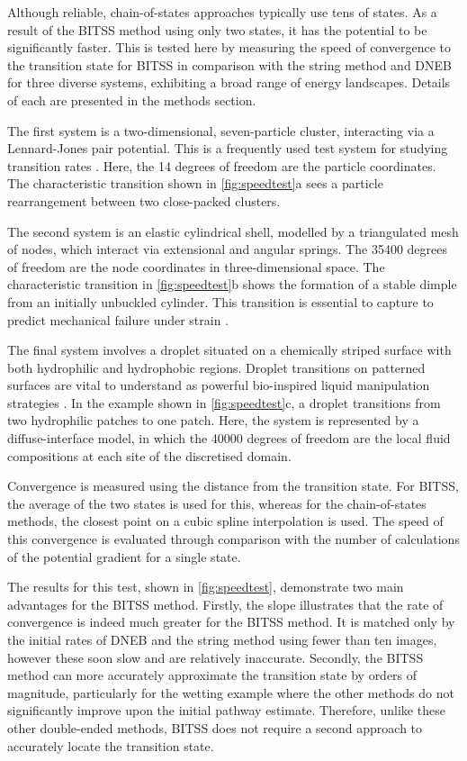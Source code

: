 \documentclass[twocolumn,10pt]{revtex4}
\begin{document}
Although reliable, chain-of-states approaches typically use tens of states.
As a result of the BITSS method using only two states, it has the potential to be significantly faster.
This is tested here by measuring the speed of convergence to the transition state for BITSS in comparison with the string method and DNEB for three diverse systems, exhibiting a broad range of energy landscapes.
Details of each are presented in the methods section.

The first system is a two-dimensional, seven-particle cluster, interacting via a Lennard-Jones pair potential.
This is a frequently used test system for studying transition rates \cite{Wales2002,Passerone2001}.
Here, the \num{14} degrees of freedom are the particle coordinates.
The characteristic transition shown in \cref{fig:speedtest}a sees a particle rearrangement between two close-packed clusters.

The second system is an elastic cylindrical shell, modelled by a triangulated mesh of nodes, which interact via extensional and angular springs.
The \num{35400} degrees of freedom are the node coordinates in three-dimensional space.
The characteristic transition in \cref{fig:speedtest}b shows the formation of a stable dimple from an initially unbuckled cylinder.
This transition is essential to capture to predict mechanical failure under strain \cite{Panter2019,Virot2017}.

The final system involves a droplet situated on a chemically striped surface with both hydrophilic and hydrophobic regions.
Droplet transitions on patterned surfaces are vital to understand as powerful bio-inspired liquid manipulation strategies  \cite{Kusumaatmaja2006,Brown2016}.
In the example shown in \cref{fig:speedtest}c, a droplet transitions from two hydrophilic patches to one patch.
Here, the system is represented by a diffuse-interface model, in which the \num{40000} degrees of freedom are the local fluid compositions at each site of the discretised domain.

Convergence is measured using the distance from the transition state.
For BITSS, the average of the two states is used for this, whereas for the chain-of-states methods, the closest point on a cubic spline interpolation is used.
The speed of this convergence is evaluated through comparison with the number of calculations of the potential gradient for a single state.

The results for this test, shown in \cref{fig:speedtest}, demonstrate two main advantages for the BITSS method.
Firstly, the slope illustrates that the rate of convergence is indeed much greater for the BITSS method.
It is matched only by the initial rates of DNEB and the string method using fewer than ten images, however these soon slow and are relatively inaccurate.
Secondly, the BITSS method can more accurately approximate the transition state by orders of magnitude, particularly for the wetting example where the other methods do not significantly improve upon the initial pathway estimate.
Therefore, unlike these other double-ended methods, BITSS does not require a second approach to accurately locate the transition state.
\end{document}
